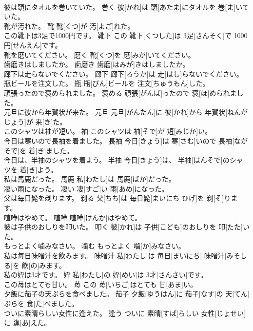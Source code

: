 \documentclass[8pt]{extreport}
\begin{document}
\begin{CJK}{UTF8}{min}
\\	彼は頭にタオルを巻いていた。	巻く	彼[かれ]は 頭[あたま]にタオルを 巻[ま]いていた。	
\\	靴が汚れた。	靴	靴[くつ]が 汚[よご]れた。	
\\	この靴下は3足で1000円です。	靴下	この 靴下[くつした]は 3足[さんそく]で 1000円[せんえん]です。	
\\	靴を磨いてください。	磨く	靴[くつ]を 磨[みが]いてください。	
\\	歯磨きはしましたか。	歯磨き	歯磨[はみが]きはしましたか。	
\\	廊下は走らないでください。	廊下	廊下[ろうか]は 走[はし]らないでください。	
\\	瓶ビールを注文した。	瓶	瓶[びん]ビールを 注文[ちゅうもん]した。	
\\	頑張ったので褒められました。	褒める	頑張[がんば]ったので 褒[ほ]められました。	
\\	元旦に彼から年賀状が来た。	元旦	元旦[がんたん]に 彼[かれ]から 年賀状[ねんがじょう]が 来[き]た。	
\\	このシャツは袖が短い。	袖	このシャツは 袖[そで]が 短[みじか]い。	
\\	今日は寒いので長袖を着ました。	長袖	今日[きょう]は 寒[さむ]いので 長袖[ながそで]を 着[き]ました。	
\\	今日は、半袖のシャツを着よう。	半袖	今日[きょう]は、 半袖[はんそで]のシャツを 着[き]よう。	
\\	私は馬鹿だった。	馬鹿	私[わたし]は 馬鹿[ばか]だった。	
\\	凄い雨になった。	凄い	凄[すご]い 雨[あめ]になった。	
\\	父は毎日髭を剃ります。	剃る	父[ちち]は 毎日髭[まいにち ひげ]を 剃[そ]ります。	
\\	喧嘩はやめて。	喧嘩	喧嘩[けんか]はやめて。	
\\	彼は子供のおしりを叩いた。	叩く	彼[かれ]は 子供[こども]のおしりを 叩[たた]いた。	
\\	もっとよく噛みなさい。	噛む	もっとよく 噛[か]みなさい。	
\\	私は毎日味噌汁を飲みます。	味噌汁	私[わたし]は 毎日[まいにち] 味噌汁[みそしる]を 飲[の]みます。	
\\	私の姪は3才です。	姪	私[わたし]の 姪[めい]は 3才[さんさい]です。	
\\	この苺はとても甘い。	苺	この 苺[いちご]はとても 甘[あま]い。	
\\	夕飯に茄子の天ぷらを食べました。	茄子	夕飯[ゆうはん]に 茄子[なす]の 天[てん]ぷらを 食[た]べました。	
\\	ついに素晴らしい女性に逢えた。	逢う	ついに 素晴[すば]らしい 女性[じょせい]に 逢[あ]えた。	

\end{CJK}
\end{document}
